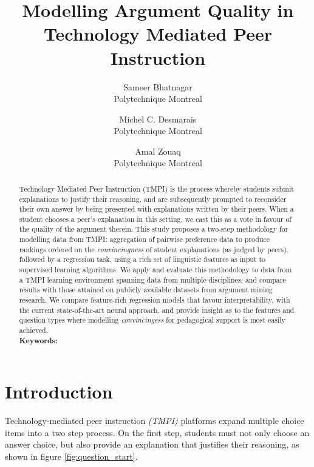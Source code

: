 \documentclass[notitlepage,12pt]{jedm}
\begin{document}
	
	\title{Modelling Argument Quality in Technology Mediated Peer Instruction}
	\date{} %
	
	\author{
		{\large Sameer Bhatnagar}
		\\Polytechnique Montreal
	 	\and 
	 	{\large Michel C. Desmarais}
	 	\\Polytechnique Montreal
	 	\and 
	 	{\large Amal Zouaq}
 		\\Polytechnique Montreal
 }

	
	\maketitle
	
	\begin{abstract}
		Technology Mediated Peer Instruction (TMPI) is the process whereby 
		students submit explanations to justify their reasoning, and are 
		subsequently prompted to reconsider their own answer by being presented 
		with explanations written by their peers. 
		When a student chooses a peer's explanation in this setting, we cast 
		this as a vote in favour of the quality of the argument therein.
		This study proposes a two-step methodology for modelling data from 
		TMPI: aggregation of pairwise preference data to produce rankings 
		ordered on the \textit{convincingness} of student explanations (as 
		judged by peers), followed by a regression task, using a rich set of 
		linguistic features as input to supervised learning algorithms.
		We apply and evaluate this methodology to data from a TMPI learning 
		environment spanning data from multiple disciplines, and compare 
		results with those attained on publicly available datasets from 
		argument mining research. 
		We compare feature-rich regression models that favour interpretability, 
		with the current state-of-the-art neural approach, and provide 
		insight as to the features and question types where modelling 
		\textit{convincingess} for pedagogical support is most easily achieved.
		\\ %
		{\parindent0pt
			\textbf{Keywords:} 
		}
	\end{abstract}

\section{Introduction}
Technology-mediated peer instruction \textit{(TMPI)} platforms 
\cite{charles_harnessing_2019,univeristy_of_british_columbia_ubc/ubcpi_2019}
expand multiple choice items into a two step process.
On the first step, students must not only choose an answer choice, but also 
provide an explanation that justifies their reasoning, as shown in figure 
\ref{fig:question_start}.
\end{document}
